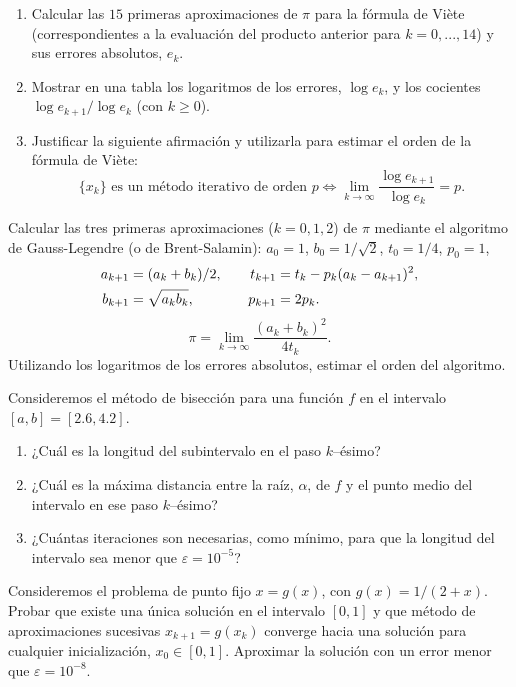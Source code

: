 \documentclass[11pt]{article}
\begin{document}
\begin{problemas}
\begin{problema}
    \begin{enumerate}
    \item Calcular las $15$ primeras aproximaciones de $\pi$ para la
      fórmula de Viète (correspondientes a la evaluación del producto
      anterior para $k=0,...,14$) y sus errores absolutos, $e_k$.
    \item Mostrar en una tabla los logaritmos de los errores, $\log
      e_k$, y los cocientes $\log e_{k+1}/\log
      e_{k}$ (con $k\ge 0$).
    \item Justificar la siguiente afirmación y utilizarla para estimar
      el orden de la fórmula de Viète:
      \begin{equation*}
        \label{eq:1}
        \{x_k\} \text{ es un método iterativo de orden } p 
        \Leftrightarrow \lim_{k\to\infty} \frac{\log e_{k+1}}{\log e_{k}}=p.
      \end{equation*}
    \end{enumerate}
  \end{problema}
  \begin{problema}
    Calcular las tres primeras aproximaciones ($k=0,1,2$) de $\pi$
    mediante el algoritmo de Gauss-Legendre (o de Brent-Salamin):
    $a_0=1$, $b_0=1/\sqrt 2$, $t_0=1/4$, $p_0=1$,
    \begin{align*}
      a_{k+1}&=(a_{k}+b_{k})/2 , &\quad
      t_{k+1}&=t_k - p_k(a_k -a_{k+1})^2, \\
      b_{k+1}& =\sqrt{a_{k}\*b_{k}}, &\quad p_{k+1}&=2p_k.
    \end{align*}
    $$
    \pi = \lim_{k\to\infty} \frac{(a_k+b_k)^2}{4t_k}.
    $$
    Utilizando los logaritmos de los errores absolutos, estimar el
    orden del algoritmo.
  \end{problema}
  \begin{problema}
    Consideremos el método de bisección para
    una función $f$ en el intervalo $[a,b]=[2.6,4.2]$. 
    \begin{enumerate}
    \item ¿Cuál es la longitud del subintervalo en el paso $k$--ésimo?
    \item ¿Cuál es la máxima distancia entre la raíz, $\alpha$, de $f$
      y el punto medio del intervalo en ese paso $k$--ésimo?
    \item ¿Cuántas iteraciones son necesarias, como mínimo, para que
      la longitud del intervalo sea menor que $\varepsilon=10^{-5}$?
    \end{enumerate}
  \end{problema}
 
  \begin{problema}
    Consideremos el problema de punto fijo $x=g(x)$, con
    $g(x)=1/(2+x)$.  Probar que existe una única solución en el
    intervalo $[0,1]$ y que método de aproximaciones sucesivas
    $x_{k+1}=g(x_k)$ converge hacia una solución para cualquier
    inicialización, $x_0\in[0,1]$. Aproximar la
    solución con un error menor que $\varepsilon=10^{-8}$.
  \end{problema}
\end{problemas}
\end{document}
